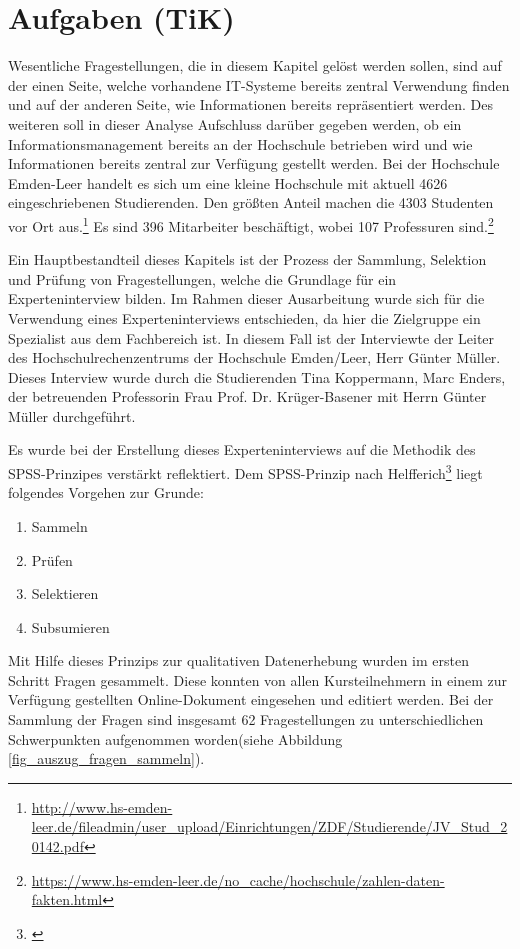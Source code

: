 \section{Aufgaben (TiK)}
Wesentliche Fragestellungen, die in diesem Kapitel gelöst werden sollen, sind auf der einen Seite, welche vorhandene IT-Systeme bereits zentral Verwendung finden und auf der anderen Seite, wie Informationen bereits repräsentiert werden. Des weiteren soll in dieser Analyse Aufschluss darüber gegeben werden, ob ein Informationsmanagement bereits an der Hochschule betrieben wird und wie Informationen bereits zentral zur Verfügung gestellt werden.  
Bei der Hochschule Emden-Leer handelt es sich um eine kleine Hochschule mit aktuell 4626 eingeschriebenen Studierenden. Den größten Anteil machen die 4303 Studenten vor Ort aus.\footnote{\url{http://www.hs-emden-leer.de/fileadmin/user_upload/Einrichtungen/ZDF/Studierende/JV_Stud_20142.pdf}} Es sind 396 Mitarbeiter beschäftigt, wobei 107 Professuren sind.\footnote{\url{https://www.hs-emden-leer.de/no_cache/hochschule/zahlen-daten-fakten.html}}

Ein Hauptbestandteil dieses Kapitels ist der Prozess der Sammlung, Selektion und Prüfung von Fragestellungen, welche die Grundlage für ein Experteninterview bilden. Im Rahmen dieser Ausarbeitung wurde sich für die Verwendung eines Experteninterviews entschieden, da hier die Zielgruppe ein Spezialist aus dem Fachbereich ist. In diesem Fall ist der Interviewte der Leiter des Hochschulrechenzentrums der Hochschule Emden/Leer, Herr Günter Müller. Dieses Interview wurde durch die Studierenden Tina Koppermann, Marc Enders, der betreuenden Professorin Frau Prof. Dr. Krüger-Basener mit Herrn Günter Müller durchgeführt. 

Es wurde bei der Erstellung dieses Experteninterviews auf die Methodik des SPSS-Prinzipes verstärkt reflektiert. Dem SPSS-Prinzip nach Helfferich\footnote{\cite{helfferich_2009}} liegt folgendes Vorgehen zur Grunde:
\begin{enumerate}
	\item Sammeln
	\item Prüfen
	\item Selektieren
	\item Subsumieren		
\end{enumerate}
Mit Hilfe dieses Prinzips zur qualitativen Datenerhebung wurden im ersten Schritt Fragen gesammelt. Diese konnten von allen Kursteilnehmern in einem zur Verfügung gestellten Online-Dokument eingesehen und editiert werden. Bei der Sammlung der Fragen sind insgesamt 62 Fragestellungen zu unterschiedlichen Schwerpunkten aufgenommen worden(siehe Abbildung \ref{fig_auszug_fragen_sammeln}).

